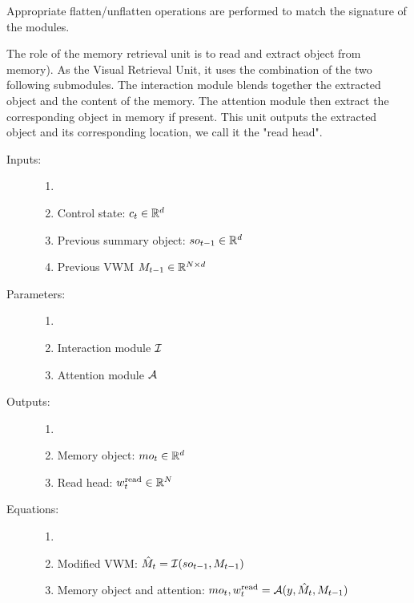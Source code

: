 \begin{note}
	Appropriate flatten/unflatten operations are performed to match the signature 
	of the modules.
\end{note}



The role of the memory retrieval unit is to read and extract object from memory).
As the Visual Retrieval Unit, it uses the combination of the two following submodules. The interaction module blends together the extracted object and the content of the memory. The attention module then extract the corresponding object in memory if present. This unit outputs the extracted object and its corresponding location, we call it the "read head".

\begin{description}
	\item[Inputs:] 
	\begin{enumerate}
		\item[]
		\item Control state: $c_t \in \mathbb{R}^d$	
		\item Previous summary object: $so_{t-1} \in  \mathbb{R}^d$
		\item Previous VWM $M_{t-1} \in \mathbb{R}^{N \times d}$
	\end{enumerate}
	
	\item[Parameters:] 
	\begin{enumerate}
		\item[]
		\item Interaction module $\mathcal{I}$
		\item Attention module $\mathcal{A}$
	\end{enumerate}
	
	\item[Outputs:] 
	\begin{enumerate}
		\item[]
		\item Memory object: $mo_t \in \mathbb{R}^d$
		\item Read head: $w^{\mathrm{read}}_t \in \mathbb{R}^N$
	\end{enumerate}

	\item[Equations:]
	\begin{enumerate}
		\item[]
		\item Modified VWM: $\hat{M}_t = \mathcal{I}(so_{t-1}, M_{t-1})$
		\item Memory object and attention: $mo_t, w^{\mathrm{read}}_t = \mathcal{A}(y, \hat{M}_t, M_{t-1})$
	\end{enumerate}
\end{description}



